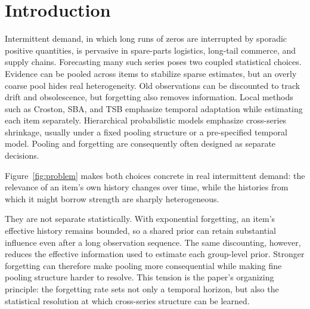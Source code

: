 \documentclass[twoside]{article}
\theoremstyle{definition}
\begin{document}
\section{Introduction}\label{sec:intro}

Intermittent demand, in which long runs of zeros are interrupted by
sporadic positive quantities, is pervasive in spare-parts logistics,
long-tail commerce, and supply chains. Forecasting many such series poses
two coupled statistical choices. Evidence can be pooled across items to
stabilize sparse estimates, but an overly coarse pool hides real
heterogeneity. Old observations can be discounted to track drift and
obsolescence, but forgetting also removes information. Local methods such
as Croston, SBA, and TSB
\citep{croston1972,syntetos2005accuracy,teunter2011} emphasize temporal
adaptation while estimating each item separately. Hierarchical
probabilistic models \citep{chapados2014,seeger2016,pitkin2024} emphasize
cross-series shrinkage, usually under a fixed pooling structure or a
pre-specified temporal model. Pooling and forgetting are consequently
often designed as separate decisions.

Figure~\ref{fig:problem} makes both choices concrete in real intermittent
demand: the relevance of an item's own history changes over time, while
the histories from which it might borrow strength are sharply
heterogeneous.

They are not separate statistically. With exponential forgetting, an
item's effective history remains bounded, so a shared prior can retain
substantial influence even after a long observation sequence. The same
discounting, however, reduces the effective information used to estimate
each group-level prior. Stronger forgetting can therefore make pooling
more consequential while making fine pooling structure harder to resolve.
This tension is the paper's organizing principle: the forgetting rate sets
not only a temporal horizon, but also the statistical resolution at which
cross-series structure can be learned.
\end{document}
